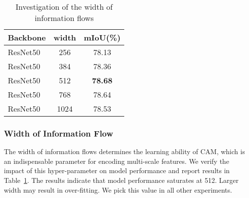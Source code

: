 \documentclass[journal]{IEEEtran}
\begin{document}
\begin{table}
\caption{Investigation of the width of information flows}
\begin{center}
\begin{tabular}{lc|c}
\toprule
\textbf{Backbone} & \textbf{width} & \textbf{mIoU(\%)} \\
\midrule\midrule
ResNet50 & 256 & 78.13 \\
ResNet50 & 384 & 78.36 \\
ResNet50 & 512 & \textbf{78.68} \\
ResNet50 & 768 & 78.64 \\
ResNet50 & 1024 & 78.53 \\
\bottomrule
\end{tabular}
\end{center}
\label{table:width_flow}
\end{table}

\begin{table}
\caption{Validation of the critical series-parallel hybrid design based on dilated ResNet50}
\begin{center}
\end{center}
\label{table:flow_guidance}
\end{table}

\subsubsection{Width of Information Flow}
The width of information flows determines the learning ability of CAM, which is an indispensable parameter for encoding multi-scale features. We verify the impact of this hyper-parameter on model performance and report results in Table~\ref{table:width_flow}. The results indicate that model performance saturates at 512. Larger width may result in over-fitting. We pick this value in all other experiments.
\end{document}

